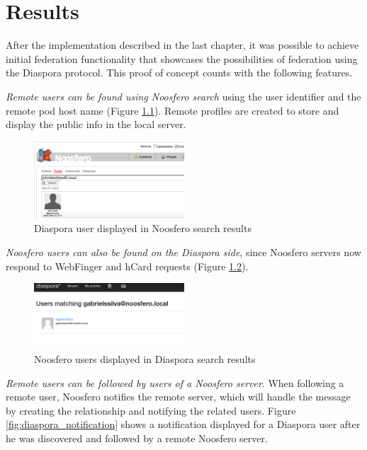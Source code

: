 \chapter{Results}
\label{chapter:6}

After the implementation described in the last chapter, it was possible
to achieve initial federation functionality that showcases the
possibilities of federation using the Diaspora protocol. This proof of
concept counts with the following features.

\textit{Remote users can be found using Noosfero search} using the user
identifier and the remote pod host name (Figure
\ref{fig:noosfero_search}). Remote profiles are created to store and
display the public info in the local server.

\begin{figure}[hbt]
  \centering
  \includegraphics[width=0.5\textwidth]{figures/noosfero_search.eps}
  \caption{Diaspora user displayed in Noosfero search results}
  \label{fig:noosfero_search}
\end{figure}

\textit{Noosfero users can also be found on the Diaspora side}, since Noosfero
servers now respond to WebFinger and hCard requests (Figure
\ref{fig:diaspora_search}).

\begin{figure}[hbt]
  \centering
    \includegraphics[width=0.5\textwidth]{figures/diaspora_search.eps}
  \caption{Noosfero users displayed in Diaspora search results}
  \label{fig:diaspora_search}
\end{figure}

\textit{Remote users can be followed by users of a Noosfero server}. When
following a remote user, Noosfero notifies the remote server, which will
handle the message by creating the relationship and notifying the
related users. Figure \ref{fig:diaspora_notification} shows a
notification displayed for a Diaspora user after he was discovered and
followed by a remote Noosfero server.


